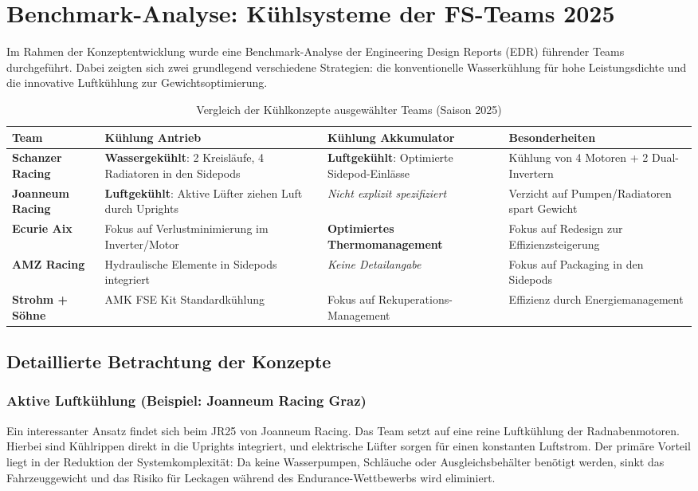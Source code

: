 \section{Benchmark-Analyse: Kühlsysteme der FS-Teams 2025}

Im Rahmen der Konzeptentwicklung wurde eine Benchmark-Analyse der Engineering Design Reports (EDR) führender Teams durchgeführt. Dabei zeigten sich zwei grundlegend verschiedene Strategien: die konventionelle Wasserkühlung für hohe Leistungsdichte und die innovative Luftkühlung zur Gewichtsoptimierung.

\begin{table}[h]
    \centering
    \caption{Vergleich der Kühlkonzepte ausgewählter Teams (Saison 2025)}
    \label{tab:kuehlung_benchmark}
    \begin{tabular}{l|p{4cm}|p{4cm}|p{3.5cm}}
        \hline
        \textbf{Team} & \textbf{Kühlung Antrieb} & \textbf{Kühlung Akkumulator} & \textbf{Besonderheiten} \\ \hline
        \textbf{Schanzer Racing} & \textbf{Wassergekühlt}: 2 Kreisläufe, 4 Radiatoren in den Sidepods & \textbf{Luftgekühlt}: Optimierte Sidepod-Einlässe & Kühlung von 4 Motoren + 2 Dual-Invertern \\ \hline
        \textbf{Joanneum Racing} & \textbf{Luftgekühlt}: Aktive Lüfter ziehen Luft durch Uprights & \textit{Nicht explizit spezifiziert} & Verzicht auf Pumpen/Radiatoren spart Gewicht \\ \hline
        \textbf{Ecurie Aix}      & Fokus auf Verlustminimierung im Inverter/Motor & \textbf{Optimiertes Thermomanagement} & Fokus auf Redesign zur Effizienzsteigerung \\ \hline
        \textbf{AMZ Racing}      & Hydraulische Elemente in Sidepods integriert & \textit{Keine Detailangabe} & Fokus auf Packaging in den Sidepods \\ \hline
        \textbf{Strohm + Söhne}  & AMK FSE Kit Standardkühlung & Fokus auf Rekuperations-Management & Effizienz durch Energiemanagement \\ \hline
    \end{tabular}
\end{table}

\subsection{Detaillierte Betrachtung der Konzepte}

\subsubsection{Aktive Luftkühlung (Beispiel: Joanneum Racing Graz)}
Ein interessanter Ansatz findet sich beim JR25 von Joanneum Racing. Das Team setzt auf eine reine Luftkühlung der Radnabenmotoren. Hierbei sind Kühlrippen direkt in die Uprights integriert, und elektrische Lüfter sorgen für einen konstanten Luftstrom. Der primäre Vorteil liegt in der Reduktion der Systemkomplexität: Da keine Wasserpumpen, Schläuche oder Ausgleichsbehälter benötigt werden, sinkt das Fahrzeuggewicht und das Risiko für Leckagen während des Endurance-Wettbewerbs wird eliminiert.

